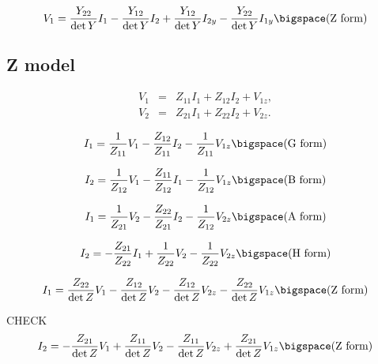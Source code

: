 \documentclass[a4paper, 12pt]{article}
\begin{document}
\begin{equation}
  V_1 = \frac{Y_{22}}{\det{Y}} I_1 - \frac{Y_{12}}{\det{Y}} I_2 + \frac{Y_{12}}{\det{Y}} I_{2y} - \frac{Y_{22}}{\det{Y}} I_{1y} \bigspace \mbox{(Z form)}
\end{equation}



\subsection{Z model}

\begin{eqnarray}
\label{eqn:ZV1}
  V_1 & = & Z_{11} I_1 + Z_{12} I_2 + V_{1z}, \\
  V_2 & = & Z_{21} I_1 + Z_{22} I_2 + V_{2z}.
\label{eqn:ZV2}
\end{eqnarray}



\begin{equation}
  I_1 = \frac{1}{Z_{11}} V_1 - \frac{Z_{12}}{Z_{11}} I_2 - \frac{1}{Z_{11}} V_{1z} \bigspace \mbox{(G form)}
\end{equation}

\begin{equation}
  I_2 = \frac{1}{Z_{12}} V_1 - \frac{Z_{11}}{Z_{12}} I_1 - \frac{1}{Z_{12}} V_{1z} \bigspace \mbox{(B form)}
\end{equation}

\begin{equation}
  I_1 = \frac{1}{Z_{21}} V_2 - \frac{Z_{22}}{Z_{21}} I_2 - \frac{1}{Z_{12}} V_{2z} \bigspace \mbox{(A form)}
\end{equation}


\begin{equation}
  I_2 = -\frac{Z_{21}}{Z_{22}} I_1 + \frac{1}{Z_{22}} V_2 - \frac{1}{Z_{22}} V_{2z} \bigspace \mbox{(H form)}
\end{equation}


\begin{equation}
  I_1 = \frac{Z_{22}}{\det{Z}} V_1 - \frac{Z_{12}}{\det{Z}} V_2 - \frac{Z_{12}}{\det{Z}} V_{2z} - \frac{Z_{22}}{\det{Z}} V_{1z} \bigspace \mbox{(Z form)}
\end{equation}

CHECK
\begin{equation}
  I_2 = -\frac{Z_{21}}{\det{Z}} V_1 + \frac{Z_{11}}{\det{Z}} V_2 - \frac{Z_{11}}{\det{Z}} V_{2z} + \frac{Z_{21}}{\det{Z}} V_{1z} \bigspace \mbox{(Z form)}
\end{equation}
\end{document}
